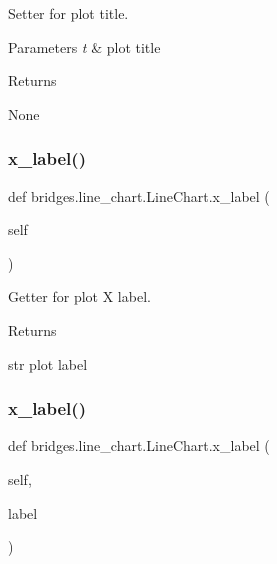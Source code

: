 Setter for plot title. 


\begin{DoxyParams}{Parameters}
{\em t} & plot title \\
\hline
\end{DoxyParams}
\begin{DoxyReturn}{Returns}


None 
\end{DoxyReturn}
\mbox{\label{classbridges_1_1line__chart_1_1_line_chart_a37436d14c6c63116d0d1540ea8ef7fc1}} 
\subsubsection{\texorpdfstring{x\_label()}{x\_label()}\hspace{0.1cm}{\footnotesize\ttfamily [1/2]}}
{\footnotesize\ttfamily def bridges.\+line\+\_\+chart.\+Line\+Chart.\+x\+\_\+label (\begin{DoxyParamCaption}\item[{}]{self }\end{DoxyParamCaption})}



Getter for plot X label. 

\begin{DoxyReturn}{Returns}


str plot label 
\end{DoxyReturn}
\mbox{\label{classbridges_1_1line__chart_1_1_line_chart_ad30576a90dcc406c46efb5902fee86f1}} 
\subsubsection{\texorpdfstring{x\_label()}{x\_label()}\hspace{0.1cm}{\footnotesize\ttfamily [2/2]}}
{\footnotesize\ttfamily def bridges.\+line\+\_\+chart.\+Line\+Chart.\+x\+\_\+label (\begin{DoxyParamCaption}\item[{}]{self,  }\item[{}]{label }\end{DoxyParamCaption})}



